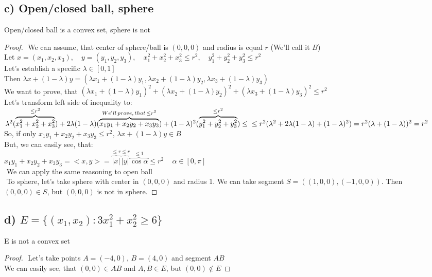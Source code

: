 \documentclass[12pt]{article}
\begin{document}
\subsection*{c) Open/closed ball, sphere}
Open/closed ball is a convex set, sphere is not
\begin{proof}
$ $\newline
We can assume, that center of sphere/ball is \((0,0,0)\) and radius is equal \(r\) (We'll call it \(B\))\\
Let \(x=(x_1, x_2, x_3),\quad y=(y_1, y_2, y_3),\quad x_1^2+x_2^2+x_3^2\leq r^2,\quad y_1^2+y_2^2+y_3^2\leq r^2\)\\
Let's establish a specific \(\lambda \in [0,1]\)\\
Then \(\lambda x+(1-\lambda)y=(\lambda x_1+(1-\lambda)y_1, \lambda x_2+(1-\lambda)y_2, \lambda x_3+(1-\lambda)y_3)\)\\
We want to prove, that \( (\lambda x_1+(1-\lambda)y_1)^2+ (\lambda x_2+(1-\lambda)y_2)^2+ (\lambda x_3+(1-\lambda)y_3)^2\leq r^2 \)\\
Let's transform left side of inequality to:\\ \( \lambda^2(\overbrace{x_1^2+x^2_2+x_3^2}^{\leq r^2})+2\lambda(1-\lambda)(\overbrace{x_1 y_1+x_2 y_2+x_3 y_3}^{We'll\,prove, \,that\,\leq r^2})+(1-\lambda)^2(\overbrace{y_1^2+y^2_2+y_3^2}^{\leq r^2})\leq \\ \leq r^2 (\lambda^2+2\lambda(1-\lambda)+(1-\lambda)^2) =r^2(\lambda+(1-\lambda))^2=r^2\)\\
So, if only \(x_1 y_1+x_2 y_2+x_3 y_3\leq r^2,\,\lambda x+(1-\lambda)y \in B\)\\
But, we can easily see, that:\\ \(x_1 y_1+x_2 y_2+x_3 y_3=<x, y>=\overbrace{|x|}^{\leq r}\overbrace{|y|}^{\leq r}\overbrace{\cos{\alpha}}^{\leq 1}\leq r^2 \quad\,\alpha \in [0,\pi]\)\\
$ $\newline
We can apply the same reasoning to open ball\\
$ $\newline
To sphere, let's take sphere with center in \((0,0,0)\) and radius 1. We can take segment \( S=((1, 0, 0), (-1, 0, 0))\). Then \((0,0,0) \in S\), but \((0,0,0)\) is not in sphere.
\end{proof}
\subsection*{d) \( E=\{ (x_1, x_2):3x_1^2+x_2^2 \geq 6 \}\)}
E is not a convex set
\begin{proof}
$ $\newline
Let's take points \(A=(-4,0), \, B=(4,0)\) and segment \(AB\)\\
We can easily see, that \((0,0) \in AB\) and \( A, B \in E\), but \( (0,0)\notin E\)
\end{proof}
\end{document}

